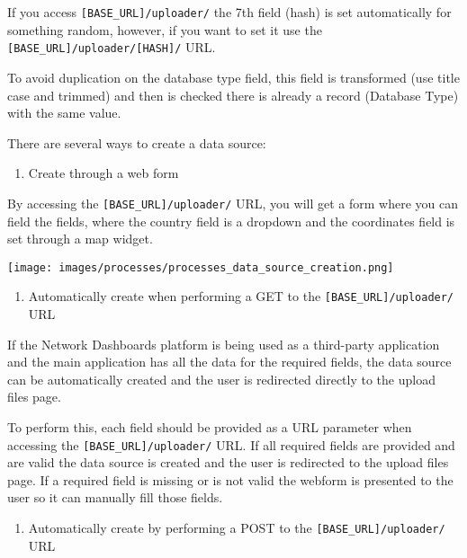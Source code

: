 \documentclass[
]{book}
\providecommand{\tightlist}{%
  \setlength{\itemsep}{0pt}\setlength{\parskip}{0pt}}
\begin{document}
If you access \texttt{{[}BASE\_URL{]}/uploader/} the 7th field (hash) is set automatically for something random, however, if you want to set it use the \texttt{{[}BASE\_URL{]}/uploader/{[}HASH{]}/} URL.

To avoid duplication on the database type field, this field is transformed (use title case and trimmed) and then is checked there is already a record (Database Type) with the same value.

There are several ways to create a data source:

\begin{enumerate}
\def\labelenumi{\arabic{enumi}.}
\tightlist
\item
  Create through a web form
\end{enumerate}

By accessing the \texttt{{[}BASE\_URL{]}/uploader/} URL, you will get a form where you can field the fields, where the country field is a dropdown and the coordinates field is set through a map widget.

\texttt{[image: images/processes/processes\_data\_source\_creation.png]}

\begin{enumerate}
\def\labelenumi{\arabic{enumi}.}
\setcounter{enumi}{1}
\tightlist
\item
  Automatically create when performing a GET to the \texttt{{[}BASE\_URL{]}/uploader/} URL
\end{enumerate}

If the Network Dashboards platform is being used as a third-party application and the main application has all the data for the required fields, the data source can be automatically created and the user is redirected directly to the upload files page.

To perform this, each field should be provided as a URL parameter when accessing the \texttt{{[}BASE\_URL{]}/uploader/} URL. If all required fields are provided and are valid the data source is created and the user is redirected to the upload files page. If a required field is missing or is not valid the webform is presented to the user so it can manually fill those fields.

\begin{enumerate}
\def\labelenumi{\arabic{enumi}.}
\setcounter{enumi}{2}
\tightlist
\item
  Automatically create by performing a POST to the \texttt{{[}BASE\_URL{]}/uploader/} URL
\end{enumerate}
\end{document}
